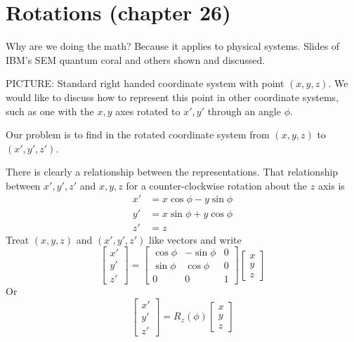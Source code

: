 %
%
%
\section{Rotations (chapter 26)}
%
Why are we doing the math?  Because it applies to physical systems.  Slides of
IBM's SEM quantum coral
and others shown and discussed.

PICTURE: Standard right handed coordinate system with point \((x,y,z)\). We would like to discuss how to represent this point in other coordinate systems, such as one with the \(x,y\) axes rotated to \(x',y'\) through an angle \(\phi\).

Our problem is to find in the rotated coordinate system from \((x,y,z)\) to \((x', y', z')\).

There is clearly a relationship between the representations.  That relationship between \(x', y', z'\) and \(x,y,z\) for a counter-clockwise rotation about the \(z\) axis is
%
\begin{equation}\label{eqn:PHY356FDec7:10}
\begin{aligned}
x' &= x \cos \phi - y \sin\phi \\
y' &= x \sin \phi + y \cos\phi \\
z' &= z
\end{aligned}
\end{equation}
%
Treat \((x,y,z)\) and \((x',y',z')\) like vectors and write
%
\begin{equation}\label{eqn:PHY356FDec7:20}
\begin{bmatrix}
x'  \\
y' \\
z'
\end{bmatrix}
=
\begin{bmatrix}
\cos \phi &- \sin\phi & 0 \\
\sin \phi & \cos\phi & 0 \\
0 & 0 & 1
\end{bmatrix}
\begin{bmatrix}
x  \\
y \\
z
\end{bmatrix}
\end{equation}
%
Or
\begin{equation}\label{eqn:PHY356FDec7:30}
\begin{bmatrix}
x'  \\
y' \\
z'
\end{bmatrix}
=
R_z(\phi)
\begin{bmatrix}
x  \\
y \\
z
\end{bmatrix}
\end{equation}
%
